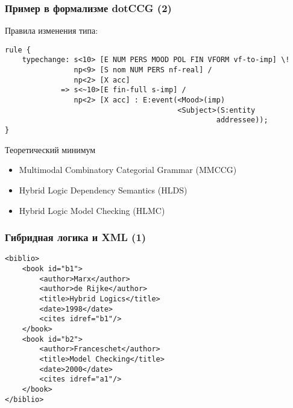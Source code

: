 \documentclass{beamer}
\begin{document}
\begin{frame}[fragile]
\frametitle{Пример в формализме dotCCG (2)}
Правила изменения типа:
{\footnotesize \begin{verbatim}
rule {
    typechange: s<10> [E NUM PERS MOOD POL FIN VFORM vf-to-imp] \! 
                np<9> [S nom NUM PERS nf-real] / 
                np<2> [X acc]
             => s<~10>[E fin-full s-imp] / 
                np<2> [X acc] : E:event(<Mood>(imp) 
                                        <Subject>(S:entity 
                                                 addressee));
}
\end{verbatim}}
\end{frame}








\begin{frame}{Теоретический минимум}
\begin{itemize}
	\item Multimodal Combinatory Categorial Grammar (MMCCG)
	\item Hybrid Logic Dependency Semantics (HLDS)
	\item Hybrid Logic Model Checking (HLMC)
\end{itemize}
\end{frame}



\begin{frame}[fragile]
\frametitle{Гибридная логика и XML (1)}
{\footnotesize 
\begin{verbatim}
<biblio>
    <book id="b1">
        <author>Marx</author>
        <author>de Rijke</author>
        <title>Hybrid Logics</title>
        <date>1998</date>
        <cites idref="b1"/>
    </book>
    <book id="b2">
        <author>Franceschet</author>
        <title>Model Checking</title>
        <date>2000</date>
        <cites idref="a1"/>
    </book>
</biblio>
\end{verbatim}
}
\end{frame}
\end{document}
